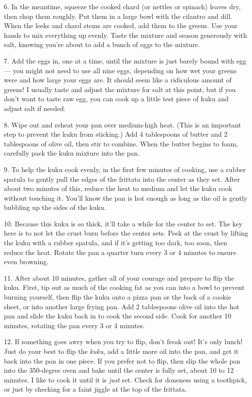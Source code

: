 6. In the meantime, squeeze the cooked chard (or nettles or spinach)
leaves dry, then chop them roughly. Put them in a large bowl with the
cilantro and dill. When the leeks and chard stems are cooked, add them
to the greens. Use your hands to mix everything up evenly. Taste the
mixture and season generously with salt, knowing you're about to add a
bunch of eggs to the mixture.

7. Add the eggs in, one at a time, until the mixture is just barely
bound with egg --- you might not need to use all nine eggs, depending on
how wet your greens were and how large your eggs are. It should seem
like a ridiculous amount of greens! I usually taste and adjust the
mixture for salt at this point, but if you don't want to taste raw egg,
you can cook up a little test piece of kuku and adjust salt if needed.

8. Wipe out and reheat your pan over medium-high heat. (This is an
important step to prevent the kuku from sticking.) Add 4 tablespoons of
butter and 2 tablespoons of olive oil, then stir to combine. When the
butter begins to foam, carefully pack the kuku mixture into the pan.

9. To help the kuku cook evenly, in the first few minutes of cooking,
use a rubber spatula to gently pull the edges of the frittata into the
center as they set. After about two minutes of this, reduce the heat to
medium and let the kuku cook without touching it. You'll know the pan is
hot enough as long as the oil is gently bubbling up the sides of the
kuku.

10. Because this kuku is so thick, it'll take a while for the center to
set. The key here is to not let the crust burn before the center sets.
Peek at the crust by lifting the kuku with a rubber spatula, and if it's
getting too dark, too soon, then reduce the heat. Rotate the pan a
quarter turn every 3 or 4 minutes to ensure even browning.

11. After about 10 minutes, gather all of your courage and prepare to
flip the kuku. First, tip out as much of the cooking fat as you can into
a bowl to prevent burning yourself, then flip the kuku onto a pizza pan
or the back of a cookie sheet, or into another large frying pan. Add 2
tablespoons olive oil into the hot pan and slide the kuku back in to
cook the second side. Cook for another 10 minutes, rotating the pan
every 3 or 4 minutes.

12. If something goes awry when you try to flip, don't freak out! It's
only lunch! Just do your best to flip the \emph{kuku}, add a little more
oil into the pan, and get it back into the pan in one piece. If you
prefer not to flip, then slip the whole pan into the 350-degree oven and
bake until the center is fully set, about 10 to 12 minutes. I like to
cook it until it is \emph{just} set. Check for doneness using a
toothpick, or just by checking for a faint jiggle at the top of the
frittata.

